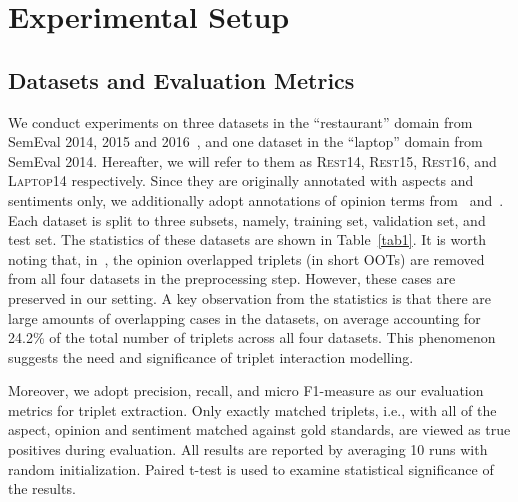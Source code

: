 \documentclass[11pt,a4paper]{article}
\begin{document}
 \section{Experimental Setup}

\subsection{Datasets and Evaluation Metrics}

We conduct experiments on three datasets  in the ``restaurant'' domain from SemEval 2014, 2015 and 2016~\cite{pontiki2014semeval,pontiki2015semeval,pontiki2016semeval}, and one dataset in the ``laptop'' domain from SemEval 2014. Hereafter, we will refer to them as \textsc{Rest14}, \textsc{Rest15}, \textsc{Rest16}, and \textsc{Laptop14} respectively. Since they are originally annotated with aspects and sentiments only, we additionally adopt annotations of opinion terms from~\citet{wang2017coupled} and~\citet{peng2019knowing}. Each dataset is split to three subsets, namely, training set, validation set, and test set. The statistics of these datasets are shown in Table~\ref{tab1}. It is worth noting that, in~\cite{peng2019knowing}, the opinion overlapped triplets (in short OOTs) are removed from all four datasets in the preprocessing step. However, these cases are preserved in our setting. A key observation from the statistics is that there are large amounts of overlapping cases in the datasets, on average accounting for 24.2\% of the total number of triplets across all four datasets. This phenomenon suggests the need and significance of triplet interaction modelling.

Moreover, we adopt precision, recall, and micro F1-measure as our evaluation metrics for triplet extraction. Only exactly matched triplets, i.e., with all of the aspect, opinion and sentiment matched against gold standards, are viewed as true positives during evaluation. All results are reported by averaging 10 runs with random initialization. Paired t-test is used to examine statistical significance of the results.
\end{document}
